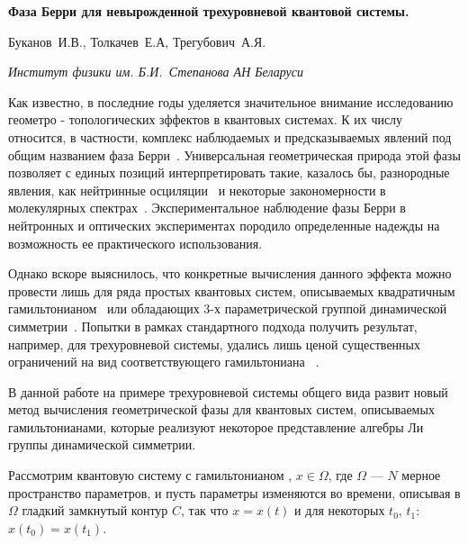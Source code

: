 \documentclass[a4paper]{article}
\def\Hhatf#1{ \ifmmode {\hat H(#1)} \else {$\hat H(#1)$} \fi}
\begin{document}
\begin{center}

{\large\bf Фаза Берри для невырожденной трехуровневой квантовой системы. }

Буканов~И.В., Толкачев~Е.А, Трегубович~А.Я.

{\it Институт физики им. Б.И.~Степанова АН Беларуси}

\end{center}

\begin{abstract}
   Построены замкнутые выражения, позволяющие вычислить фазу Берри,
возникающую при динамической эволюции параметров невырожденной
трехуровневой квантовой системы общего вида.
\end{abstract}

Как известно, в последние годы уделяется значительное внимание исследованию
геометро - топологических зффектов в квантовых системах. К их числу
относится, в частности, комплекс наблюдаемых и предсказываемых явлений
под общим названием фаза Берри~\cite{FirstBerryWork,AllBerryPhase}.
Универсальная геометрическая природа этой фазы позволяет с единых позиций
интерпретировать такие, казалось бы, разнородные явления, как нейтринные
осциляции~\cite{NaumovWork} и некоторые закономерности в молекулярных
спектрах~\cite{AboutPhaseInSpectra}. Экспериментальное наблюдение фазы Берри
в нейтронных и оптических экспериментах породило определенные надежды на
возможность ее практического использования.

Однако вскоре выяснилось, что конкретные вычисления данного эффекта можно
провести лишь для ряда простых квантовых систем, описываемых квадратичным
гамильтонианом~\cite{About2Hamiltonian} или обладающих 3-х параметрической
группой динамической симметрии~\cite{FirstBerryWork,AboutExactSolution}.
Попытки в рамках стандартного подхода
получить результат, например, для трехуровневой системы, удались лишь
ценой существенных ограничений на вид соответствующего
гамильтониана ~\cite{CeulemansWork,KorenblitWork}.

В данной работе на примере трехуровневой системы общего вида развит новый
метод вычисления геометрической фазы для квантовых систем, описываемых
гамильтонианами, которые реализуют некоторое представление алгебры Ли
группы динамической симметрии.

Рассмотрим квантовую систему с гамильтонианом \Hhatf{x}, $x\in \Omega$,
где $\Omega $ --- $N$ мерное пространство параметров, и пусть параметры
изменяются во времени, описывая в $\Omega$ гладкий замкнутый контур $C$,
так что $x=x(t)$ и для некоторых $t_0$, $t_1$: $x(t_0)=x(t_1)$.
\end{document}
